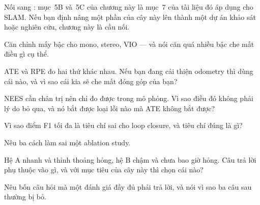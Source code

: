 \documentclass[../../vslam.tex]{subfiles}
\begin{document}
Nối sang : mục~5B và~5C của chương này là mục~7 của tài liệu đó áp dụng cho SLAM. Nếu bạn định nâng một phần của cây này lên thành một dự án khảo sát hoặc nghiên cứu, chương này là cầu nối.

\begin{tukiem}
\item Căn chỉnh mấy bậc cho mono, stereo, VIO --- và nói căn quá nhiều bậc che mất điều gì cụ thể.
\item ATE và RPE đo hai thứ khác nhau. Nếu bạn đang cải thiện odometry thì dùng cái nào, và vì sao cái kia sẽ che mất đóng góp của bạn?
\item NEES cần chân trị nên chỉ đo được trong mô phỏng. Vì sao điều đó không phải lý do bỏ qua, và nó bắt được loại lỗi nào mà ATE không bắt được?
\item Vì sao điểm F1 tối đa là tiêu chí sai cho loop closure, và tiêu chí đúng là gì?
\item Nêu ba cách làm sai một ablation study.
\item Hệ A nhanh và thỉnh thoảng hỏng, hệ B chậm và chưa bao giờ hỏng. Câu trả lời phụ thuộc vào gì, và với mục tiêu của cây này thì chọn cái nào?
\item Nêu bốn câu hỏi mà một đánh giá đầy đủ phải trả lời, và nói vì sao ba câu sau thường bị bỏ.
\end{tukiem}
\ifSubfilesClassLoaded{\printbibliography[title={Nguồn}]}{}
\end{document}
